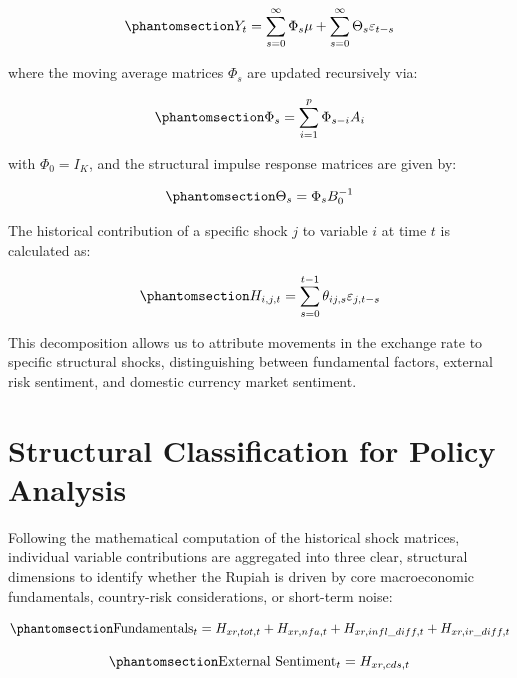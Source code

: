 \documentclass[
  manuscript=article,
  layout=publish,
  year=2026,
  volume=6,
]{den}
\begin{document}
\begin{equation}\phantomsection\label{eq-vma-representation}{
Y_t = \sum_{s=0}^{\infty} \Phi_s \mu + \sum_{s=0}^{\infty} \Theta_s \varepsilon_{t-s}
}\end{equation}

where the moving average matrices \(\Phi_s\) are updated recursively
via:

\begin{equation}\phantomsection\label{eq-phi-recursion}{
\Phi_s = \sum_{i=1}^{p} \Phi_{s-i} A_i
}\end{equation}

with \(\Phi_0 = I_K\), and the structural impulse response matrices are
given by:

\begin{equation}\phantomsection\label{eq-theta-definition}{
\Theta_s = \Phi_s B_0^{-1}
}\end{equation}

The historical contribution of a specific shock \(j\) to variable \(i\)
at time \(t\) is calculated as:

\begin{equation}\phantomsection\label{eq-historical-contribution}{
H_{i,j,t} = \sum_{s=0}^{t-1} \theta_{ij, s} \varepsilon_{j, t-s}
}\end{equation}

This decomposition allows us to attribute movements in the exchange rate
to specific structural shocks, distinguishing between fundamental
factors, external risk sentiment, and domestic currency market
sentiment.

\section{Structural Classification for Policy
Analysis}\label{structural-classification-for-policy-analysis}

Following the mathematical computation of the historical shock matrices,
individual variable contributions are aggregated into three clear,
structural dimensions to identify whether the Rupiah is driven by core
macroeconomic fundamentals, country-risk considerations, or short-term
noise:

\begin{equation}\phantomsection\label{eq-fundamentals}{
\text{Fundamentals}_t = H_{xr,tot,t} + H_{xr,nfa,t} + H_{xr,infl\_diff,t} + H_{xr,ir\_diff,t}
}\end{equation}

\begin{equation}\phantomsection\label{eq-external-sentiment}{
\text{External Sentiment}_t = H_{xr,cds,t}
}\end{equation}
\end{document}

